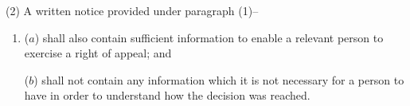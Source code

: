 \documentclass[12pt,a4paper]{article}
\begin{document}
(2) A written notice provided under paragraph (1)–
\begin{enumerate}\item[]
($a$) shall also contain sufficient information to enable a relevant person to exercise a right of appeal; and

($b$) shall not contain any information which it is not necessary for a person to have in order to understand how the decision was reached.
\end{enumerate}

\end{document}
